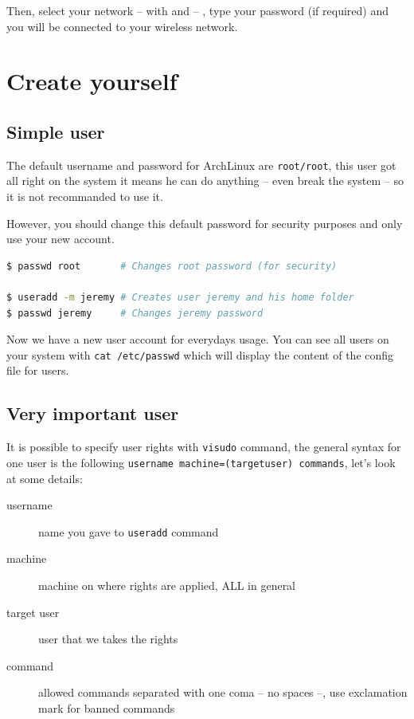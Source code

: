 Then, select your network -- with \keys{\arrowkeyup} and \keys{\arrowkeydown} -- 
, type your password (if required) and you will be connected to your wireless 
network.
\newpage
\section{Create yourself}
\subsection{Simple user}\label{subsec:SimpleUser}
The default username and password for ArchLinux are \texttt{root/root}, this 
user got all right on the system it means he can do anything -- even break the 
system -- so it is not recommanded to use it. 

However, you should change this default password for security purposes and only 
use your new account.
\\
\begin{lstlisting}[language=bash,caption=Create a new user called jeremy]
$ passwd root       # Changes root password (for security)

$ useradd -m jeremy # Creates user jeremy and his home folder
$ passwd jeremy     # Changes jeremy password
\end{lstlisting}

Now we have a new user account for everydays usage. You can see all users on 
your system with \og{}\texttt{cat /etc/passwd}\fg{} which will display the 
content of the config file for users.

\subsection{Very important user}
It is possible to specify user rights with \texttt{visudo} command, the general syntax for one user is 
the following \og{}\texttt{username machine=(targetuser) commands}\fg{}, 
let's look at some details:

\begin{description}
\item[username] name you gave to \texttt{useradd} command
\item[machine] machine on where rights are applied, ALL in general
\item[target user] user that we takes the rights
\item[command] allowed commands separated with one coma -- no spaces --, 
use exclamation mark for banned commands
\end{description}

